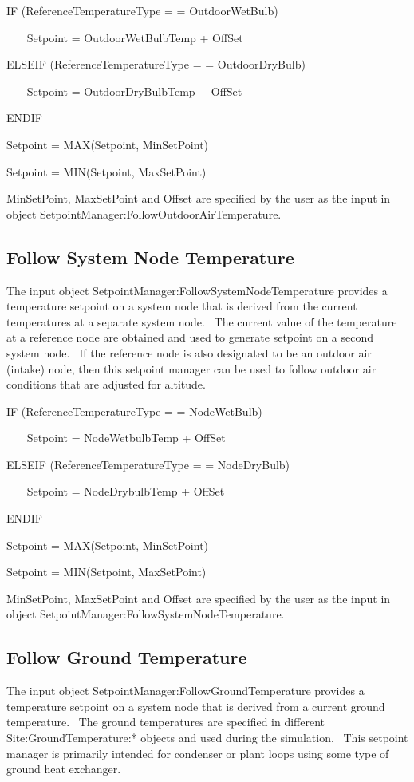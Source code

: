 IF (ReferenceTemperatureType = = OutdoorWetBulb)

~~~ Setpoint = OutdoorWetBulbTemp + OffSet

ELSEIF (ReferenceTemperatureType = = OutdoorDryBulb)

~~~ Setpoint = OutdoorDryBulbTemp + OffSet

ENDIF

Setpoint = MAX(Setpoint, MinSetPoint)

Setpoint = MIN(Setpoint, MaxSetPoint)

MinSetPoint, MaxSetPoint and Offset are specified by the user as the input in object SetpointManager:FollowOutdoorAirTemperature.

\subsection{Follow System Node Temperature}\label{follow-system-node-temperature}

The input object SetpointManager:FollowSystemNodeTemperature provides a temperature setpoint on a system node that is derived from the current temperatures at a separate system node.~ The current value of the temperature at a reference node are obtained and used to generate setpoint on a second system node.~ If the reference node is also designated to be an outdoor air (intake) node, then this setpoint manager can be used to follow outdoor air conditions that are adjusted for altitude.

IF (ReferenceTemperatureType = = NodeWetBulb)

~~~ Setpoint = NodeWetbulbTemp + OffSet

ELSEIF (ReferenceTemperatureType = = NodeDryBulb)

~~~ Setpoint = NodeDrybulbTemp + OffSet

ENDIF

Setpoint = MAX(Setpoint, MinSetPoint)

Setpoint = MIN(Setpoint, MaxSetPoint)

MinSetPoint, MaxSetPoint and Offset are specified by the user as the input in object SetpointManager:FollowSystemNodeTemperature.

\subsection{Follow Ground Temperature}\label{follow-ground-temperature}

The input object SetpointManager:FollowGroundTemperature provides a temperature setpoint on a system node that is derived from a current ground temperature.~ The ground temperatures are specified in different Site:GroundTemperature:* objects and used during the simulation.~ This setpoint manager is primarily intended for condenser or plant loops using some type of ground heat exchanger.

